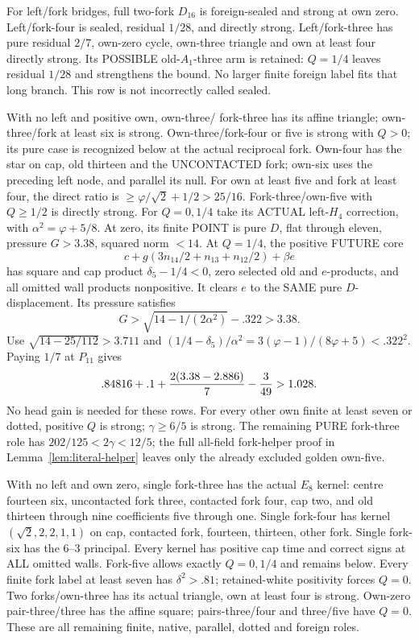 For left/fork bridges, full two-fork
\(D_{16}\) is foreign-sealed and strong
at own zero.
Left/fork-four is sealed, residual \(1/28\),
and directly strong.
Left/fork-three has pure residual \(2/7\),
own-zero cycle, own-three triangle and
own at least four directly strong.
Its POSSIBLE old-\(A_1\)-three arm is
retained: \(Q=1/4\) leaves residual
\(1/28\) and strengthens the bound.
No larger finite foreign label fits
that long branch.
This row is not incorrectly called sealed.

With no left and positive own, own-three/
fork-three has its affine triangle;
own-three/fork at least six is strong.
Own-three/fork-four or five is strong
with \(Q>0\); its pure case is recognized
below at the actual reciprocal fork.
Own-four has the star on cap, old
thirteen and the UNCONTACTED fork;
own-six uses the preceding left node,
and parallel its null.
For own at least five and fork at
least four, the direct ratio is
\(\ge\varphi/\sqrt2+1/2>25/16\).
Fork-three/own-five with \(Q\ge1/2\)
is directly strong.
For \(Q=0,1/4\) take its ACTUAL
left-\(H_4\) correction, with
\(\alpha^2=\varphi+5/8\).
At zero, its finite POINT is pure \(D\),
flat through eleven, pressure \(G>3.38\),
squared norm \(<14\).
At \(Q=1/4\), the positive FUTURE core
\[
             c+g(3n_{14}/2+n_{13}+n_{12}/2)+\beta e
\]
has square and cap product
\(\delta_5-1/4<0\), zero selected old
and \(e\)-products, and all omitted
wall products nonpositive.
It clears \(e\) to the SAME pure
\(D\)-displacement.
Its pressure satisfies
\[
             G>\sqrt{14-1/(2\alpha^2)}-.322>3.38 .
\]
Use \(\sqrt{14-25/112}>3.711\) and
\((1/4-\delta_5)/\alpha^2
=3(\varphi-1)/(8\varphi+5)<.322^2\).
Paying \(1/7\) at \(P_{11}\) gives
\[
                 .84816+.1+{2(3.38-2.886)\over7}-{3\over49}>1.028 .
\]
No head gain is needed for these rows.
For every other own finite at least
seven or dotted, positive \(Q\) is
strong; \(\gamma\ge6/5\) is strong.
The remaining PURE fork-three role
has \(202/125<2\gamma<12/5\);
the full all-field fork-helper proof
in Lemma~\ref{lem:literal-helper}
leaves only the already excluded golden
own-five.

With no left and own zero, single
fork-three has the actual \(E_8\) kernel:
centre fourteen six, uncontacted fork
three, contacted fork four, cap two,
and old thirteen through nine
coefficients five through one.
Single fork-four has kernel
\((\sqrt2,2,2,1,1)\) on cap, contacted
fork, fourteen, thirteen, other fork.
Single fork-six has the \(6\)--\(3\)
principal.
Every kernel has positive cap time and
correct signs at ALL omitted walls.
Fork-five allows exactly \(Q=0,1/4\)
and remains below.
Every finite fork label at least seven
has \(\delta^2>.81\); retained-white
positivity forces \(Q=0\).
Two forks/own-three has its actual
triangle, own at least four is strong.
Own-zero pair-three/three has the affine
square; pairs-three/four and three/five
have \(Q=0\).
These are all remaining finite, native,
parallel, dotted and foreign roles.

